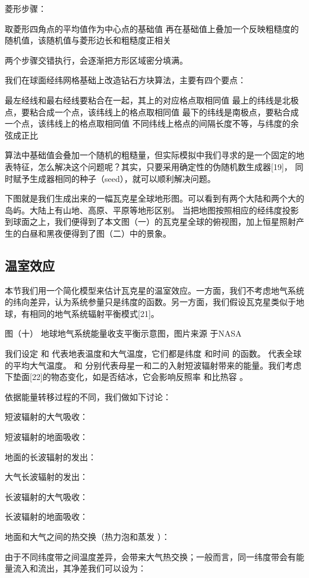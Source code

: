 \documentclass[a4paper,10.5pt]{article}
\begin{document}
菱形步骤：

取菱形四角点的平均值作为中心点的基础值
再在基础值上叠加一个反映粗糙度的随机值，该随机值与菱形边长和粗糙度正相关

两个步骤交错执行，会逐渐把方形区域密分填满。

我们在球面经纬网格基础上改造钻石方块算法，主要有四个要点：

最左经线和最右经线要粘合在一起，其上的对应格点取相同值
最上的纬线是北极点，要粘合成一个点，该纬线上的格点取相同值
最下的纬线是南极点，要粘合成一个点，该纬线上的格点取相同值
不同纬线上格点的间隔长度不等，与纬度的余弦成正比

算法中基础值会叠加一个随机的粗糙量，但实际模拟中我们寻求的是一个固定的地表特征，怎么解决这个问题呢？其实，只要采用确定性的伪随机数生成器[19]，
同时赋予生成器相同的种子（seed），就可以顺利解决问题。

下图就是我们生成出来的一幅瓦克星全球地形图。可以看到有两个大陆和两个大的岛屿。大陆上有山地、高原、平原等地形区别。
当把地图按照相应的经纬度投影到球面之上，我们便得到了本文图（一）的瓦克星全球的俯视图，加上恒星照射产生的白昼和黑夜便得到了图（二）中的景象。

\subsection{温室效应}

本节我们用一个简化模型来估计瓦克星的温室效应。一方面，我们不考虑地气系统的纬向差异，认为系统参量只是纬度的函数。另一方面，我们假设瓦克星类似于地球，有相同的地气系统辐射平衡模式[21]。


图（十）
地球地气系统能量收支平衡示意图，图片来源 于NASA

我们设定  和  代表地表温度和大气温度，它们都是纬度  和时间  的函数。   代表全球的平均大气温度。 和   分别代表母星一和二的入射短波辐射带来的能量。我们考虑下垫面[22]的物态变化，如是否结冰，它会影响反照率  和比热容  。

依据能量转移过程的不同，我们做如下讨论：

短波辐射的大气吸收：

短波辐射的地面吸收：

地面的长波辐射的发出：

大气长波辐射的发出：

长波辐射的大气吸收：

长波辐射的地面吸收：

地面和大气之间的热交换（热力泡和蒸发 ）：

由于不同纬度带之间温度差异，会带来大气热交换；一般而言，同一纬度带会有能量流入和流出，其净差我们可以设为：
\end{document}
